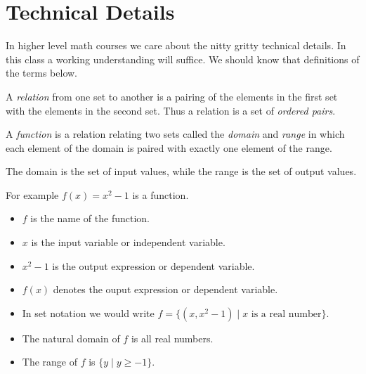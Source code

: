 \documentclass{ximera}
\begin{document}
\section*{Technical Details}
In higher level math courses we care about the nitty gritty technical details. In this class a working understanding will suffice. We should know that definitions of the terms below.


A \emph{relation} from one set to another is a pairing of the elements in the first set with the elements in the second set. Thus a relation is a set of \emph{ordered pairs}.

A \emph{function} is a relation relating two sets called the \emph{domain} and \emph{range} in which each element of the domain is paired with exactly one element of the range. 

The domain is the set of input values, while the range is the set of output values.

For example $f(x)=x^2-1$ is a function.
\begin{itemize}
\item $f$ is the name of the function.
\item $x$ is the input variable or independent variable.
\item  $x^2-1$ is the output expression or dependent variable.
\item $f(x)$ denotes the ouput expression or dependent variable.
\item In set notation we would write $f=\{(x,x^2-1)\mid x\text{ is a real number}\}$.
\item The natural domain of $f$ is all real numbers.
\item The range of $f$ is $\{y\mid y\ge-1\}$.
\end{itemize}
\end{document}
